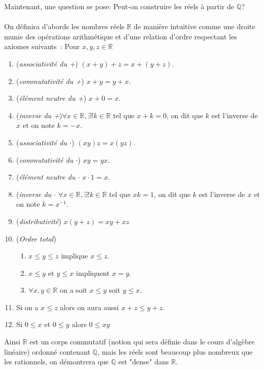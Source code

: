 \documentclass[oneside,12pt,french,table]{book}
\theoremstyle{definition}
\theoremstyle{plain}
\theoremstyle{remark}
\newcommand{\Rr}{{\mathbb{R}}}
\newcommand{\Qq}{{\mathbb{Q}}}
\begin{document}
\begin{tcolorbox}
Maintenant, une question se pose: Peut-on construire les réels à partir de $\Qq$? \\\\
On définira d'abords les nombres réels $\Rr$ de manière intuitive comme une droite munie des opérations arithmétique et d'une relation d'ordre respectant les axiomes suivants : Pour $x,y,z\in \Rr$
    \begin{enumerate}
        \item (\textit{associativité du +}) $(x+y)+z=x+(y+z)$.
        \item (\textit{commutativité du +}) $x+y=y+x$.
        \item (\textit{élément neutre du +}) $x+0=x$.
        \item (\textit{inverse du +})$\forall x\in \Rr , \exists ! k \in \Rr$ tel que $x+k=0$, on dit que $k$ est l'inverse de $x$ et on note $k=-x$.
        \item (\textit{associativité du $\cdot$}) $(xy)z=x(yz)$.
        \item (\textit{commutativité du $\cdot$}) $xy=yx$.
        \item (\textit{élément neutre du $\cdot$} $x\cdot 1=x$.
        \item (\textit{inverse du $\cdot$} $\forall x\in \Rr , \exists ! k \in \Rr$ tel que $xk=1$, on dit que $k$ est l'inverse de $x$ et on note $k=x^{-1}$.
        \item (\textit{distributivité}) $x(y+z)=xy+xz$
        \item (\textit{Ordre total}) 
        \begin{enumerate}
            \item $x\leq y \leq z$ implique $x\leq z $.
            \item $x\leq y$ et $y\leq x$ impliquent $x=y$.  
            \item $\forall x,y \in \Rr$ on a soit $x\leq y$ soit $y\leq x$. 
        \end{enumerate}
        \item Si on a $x\leq z$ alors on aura aussi $x+z\leq y+z$.
        \item Si $0\leq x$ et $0\leq y$ alors $0\leq xy$
        \end{enumerate}
Ainsi $\Rr$ est un corps commutatif (notion qui sera définie dans le cours d'algèbre linéaire) ordonné contenant $\Qq$, mais les réels sont beaucoup plus nombreux que les rationnels, on démontrera que $\Qq$ est "dense" dans $\Rr$. 
\end{tcolorbox}
\end{document}
